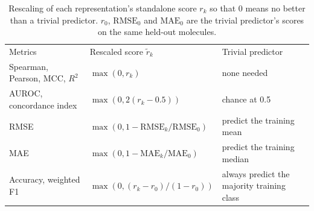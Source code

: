 \begin{table}[t]
\caption{Rescaling of each representation's standalone score $r_k$ so that 0 means no better than a trivial predictor. $r_0$, $\mathrm{RMSE}_0$ and $\mathrm{MAE}_0$ are the trivial predictor's scores on the same held-out molecules.}
\label{tab:standalone-rescaling}
\begin{tabular}{lll}
Metrics & Rescaled score $\tilde r_k$ & Trivial predictor \\
Spearman, Pearson, MCC, $R^2$ & $\max(0, r_k)$ & none needed \\
AUROC, concordance index & $\max(0, 2(r_k - 0.5))$ & chance at 0.5 \\
RMSE & $\max(0, 1 - \mathrm{RMSE}_k/\mathrm{RMSE}_0)$ & predict the training mean \\
MAE & $\max(0, 1 - \mathrm{MAE}_k/\mathrm{MAE}_0)$ & predict the training median \\
Accuracy, weighted F1 & $\max(0, (r_k - r_0)/(1 - r_0))$ & always predict the majority training class \\


\end{tabular}
\end{table}
